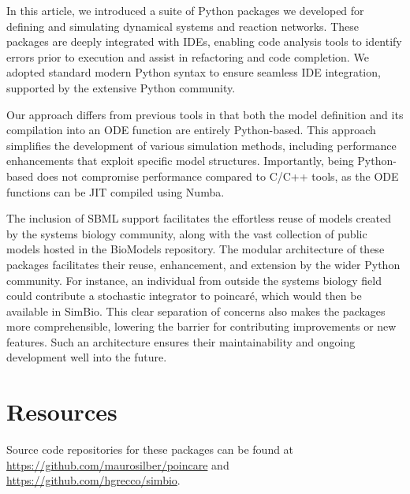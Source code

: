 \documentclass[
  letterpaper,
  DIV=11,
  numbers=noendperiod]{scrartcl}
\begin{document}
In this article, we introduced a suite of Python packages we developed
for defining and simulating dynamical systems and reaction networks.
These packages are deeply integrated with
\acp{IDE}, enabling code analysis tools to identify errors
prior to execution and assist in refactoring and code completion. We
adopted standard modern Python syntax to ensure seamless IDE
integration, supported by the extensive Python community.

Our approach differs from previous tools in that both the model
definition and its compilation into an
\ac{ODE} function are entirely Python-based. This approach simplifies the
development of various simulation methods, including performance
enhancements that exploit specific model structures. Importantly, being
Python-based does not compromise performance compared to C/C++ tools, as
the \ac{ODE} functions can be \ac{JIT} compiled using Numba.

The inclusion of \ac{SBML} support facilitates the effortless reuse of models
created by the systems biology community, along with the vast collection
of public models hosted in the BioModels repository. The modular
architecture of these packages facilitates their reuse, enhancement, and
extension by the wider Python community. For instance, an individual
from outside the systems biology field could contribute a stochastic
integrator to poincaré, which would then be available in SimBio. This
clear separation of concerns also makes the packages more
comprehensible, lowering the barrier for contributing improvements or
new features. Such an architecture ensures their maintainability and
ongoing development well into the future.

\hypertarget{resources}{%
\section{Resources}\label{resources}}

Source code repositories for these packages can be found at
\url{https://github.com/maurosilber/poincare} and
\url{https://github.com/hgrecco/simbio}.



\end{document}
